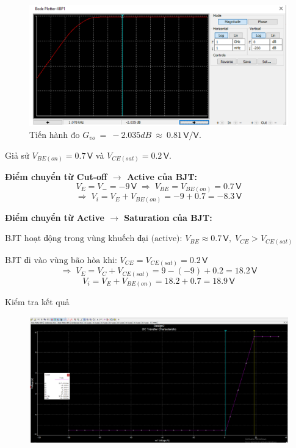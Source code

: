 \begin{figure}[H]
	\centering
	\includegraphics[width=\linewidth]{./my-chapters/my-images/Question3/b_gv.png}
	\caption{Tiến hành đo $G_{vo}\ =\ -2.035dB\ \approx\ 0.81\,\textsf{V/V}$.}
\end{figure}


Giả sử $V_{BE(on)}=0.7\,\textsf{V}$ và $V_{CE(sat)}=0.2\,\textsf{V}$. 

\textbf{Điểm chuyển từ Cut-off $\rightarrow$ Active của BJT:}
\[
V_{E}=V_{-}=-9\,\textsf{V} \;\Rightarrow\; V_{BE}=V_{BE(on)}=0.7\,\textsf{V}
\]
\[
\Rightarrow\; V_{i}=V_{E}+V_{BE(on)}=-9+0.7=-8.3\,\textsf{V}
\]

\textbf{Điểm chuyển từ Active $\rightarrow$ Saturation của BJT:}

$\text{BJT hoạt động trong vùng khuếch đại (active): } V_{BE}\approx0.7\,\textsf{V},\; V_{CE}>V_{CE(sat)}$

$\text{BJT đi vào vùng bão hòa khi: } V_{CE}=V_{CE(sat)}=0.2\,\textsf{V}$
\[
\Rightarrow\; V_{E}=V_{C}+V_{CE(sat)}=9-\left(-9\right)+0.2=18.2\,\textsf{V}
\]
\[
V_{i}=V_{E}+V_{BE(on)}=18.2+0.7=18.9\,\textsf{V}
\]

Kiểm tra kết quả

\begin{figure}[H]
	\centering
	\includegraphics[width=.9\linewidth]{./my-chapters/my-images/Question3/c_ketqua.png}
\end{figure}

